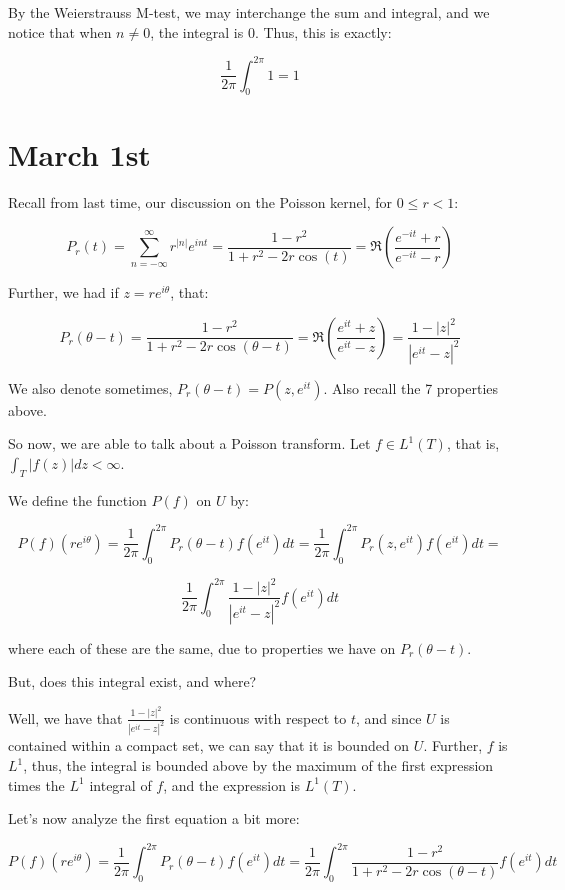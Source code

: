 \documentclass[10pt]{article}
\begin{document}
By the Weierstrauss M-test, we may interchange the sum and integral, and we notice that when $n \not = 0$, the integral is 0. Thus, this is exactly:

$$ \frac{1}{2\pi} \int_0^{2\pi} 1 = 1$$

\section*{March 1st}

Recall from last time, our discussion on the Poisson kernel, for $0 \leq r < 1$:

$$P_r(t) = \sum_{n=-\infty}^\infty r^{|n|} e^{int} = \frac{1 - r^2}{1 + r^2 - 2r \cos(t)} = \Re \left(\frac{e^{-it} + r}{e^{-it} - r}\right)$$

Further, we had if $z = re^{i\theta}$, that:

$$P_r(\theta - t) = \frac{1 - r^2}{1 + r^2 - 2r \cos(\theta - t)} = \Re \left(\frac{e^{it} + z}{e^{it} - z}\right) = \frac{1 - |z|^2}{|e^{it} - z|^2}$$

We also denote sometimes, $P_r(\theta - t) = P(z,e^{it})$. Also recall the 7 properties above. 

So now, we are able to talk about a Poisson transform. Let $f \in L^1(T)$, that is, $\int_{T} |f(z)| dz < \infty$.

We define the function $P(f)$ on $U$ by:

$$P(f) (re^{i\theta}) = \frac{1}{2\pi} \int_0^{2\pi} P_r(\theta - t) f(e^{it}) dt  = \frac{1}{2\pi} \int_0^{2\pi} P_r(z, e^{it} ) f(e^{it}) dt = $$

$$ \frac{1}{2\pi} \int_0^{2\pi} \frac{1 - |z|^2}{|e^{it} - z|^2} f(e^{it}) dt $$ 

where each of these are the same, due to properties we have on $P_r( \theta - t)$.

But, does this integral exist, and where?

Well, we have that $\frac{1 - |z|^2}{|e^{it} - z|^2} $ is continuous with respect to $t$, and since $U$ is contained within a compact set, we can say that it is bounded on $U$. Further, $f$ is $L^1$, thus, the integral is bounded above by the maximum of the first expression times the $L^1$ integral of $f$, and the expression is $L^1(T)$.

Let’s now analyze the first equation a bit more:

$$P(f) (re^{i\theta}) = \frac{1}{2\pi} \int_0^{2\pi} P_r(\theta - t) f(e^{it}) dt  = \frac{1}{2\pi} \int_0^{2\pi} \frac{1 - r^2}{1 + r^2 - 2r \cos(\theta - t)} f(e^{it}) dt$$
\end{document}
